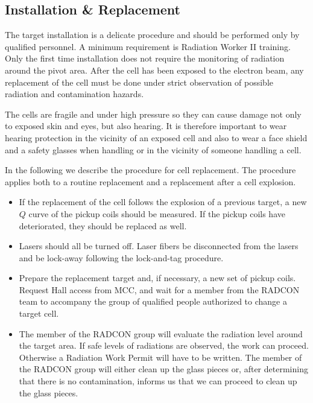 {\subsection{Installation \& Replacement}

\begin{safetyen}{10}{5}
The target installation is a delicate procedure and should be
performed only by qualified personnel. A minimum requirement is
Radiation Worker II training.  Only the first time installation does
not require the monitoring of radiation around the pivot area. After
the cell has been exposed to the electron beam, any replacement of the
cell must be done under strict observation of possible radiation and
contamination hazards.

The cells are fragile and under high pressure so they can cause damage
not only to exposed skin and eyes, but also hearing.  It is therefore
important to wear hearing protection in the vicinity of an exposed
cell and also to wear a face shield and a safety glasses when handling
or in the vicinity of someone handling a cell.

\end{safetyen}

In the following we describe the procedure for cell replacement. The
procedure applies both to a routine replacement and a replacement
after a cell  explosion.

\begin{itemize}
\item 
If the replacement of the cell follows the explosion of a previous
target, a new $Q$ curve of the pickup coils should be measured. If the
pickup coils have deteriorated, they should be replaced as well.

\item
Lasers should all be turned off. Laser fibers be disconnected from the lasers
and be lock-away following the lock-and-tag procedure.

\item 
Prepare the replacement target and, if necessary, a new set of
pickup coils. Request Hall access from MCC, and wait for a member from
the RADCON team to accompany the group of qualified people authorized
to change a target cell.

\item  
The member of the RADCON group will evaluate the radiation level
around the target area. If safe levels of radiations are observed, the
work can proceed. Otherwise a Radiation Work Permit will have to be
written. The member of the RADCON group will either clean up the 
glass pieces or, after determining that there is no contamination, informs 
us that we can proceed to clean up the glass pieces.


\end{itemize}}
